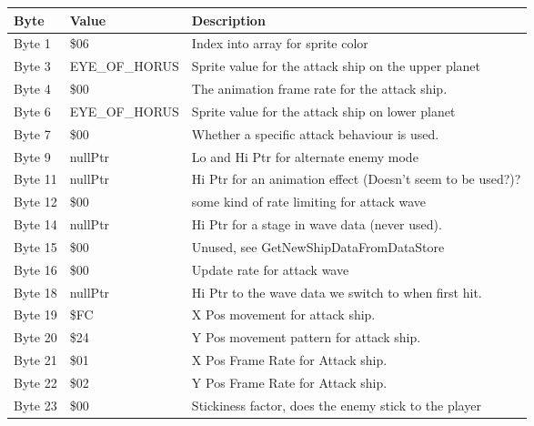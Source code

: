\begin{figure}[H]
{\begin{adjustbox}{width=12cm}
\begin{tabular}{lll}
\toprule
 Byte    & Value              & Description                                                        \\
\midrule
 Byte 1  & \$06                & Index into array for sprite color                                  \\
 Byte 3  & EYE\_OF\_HORUS       & Sprite value for the attack ship on the upper planet               \\
 Byte 4  & \$00                & The animation frame rate for the attack ship.                      \\
 Byte 6  & EYE\_OF\_HORUS       & Sprite value for the attack ship on lower planet                   \\
 Byte 7  & \$00                & Whether a specific attack behaviour is used.                       \\
 Byte 9  & nullPtr            & Lo and Hi Ptr for alternate enemy mode                             \\
 Byte 11 & nullPtr            & Hi Ptr for an animation effect (Doesn't seem to be used?)?         \\
 Byte 12 & \$00                & some kind of rate limiting for attack wave                         \\
 Byte 14 & nullPtr            & Hi Ptr for a stage in wave data (never used).                      \\
 Byte 15 & \$00                & Unused, see GetNewShipDataFromDataStore                            \\
 Byte 16 & \$00                & Update rate for attack wave                                        \\
 Byte 18 & nullPtr            & Hi Ptr to the wave data we switch to when first hit.               \\
 Byte 19 & \$FC                & X Pos movement for attack ship.                                    \\
 Byte 20 & \$24                & Y Pos movement pattern for attack ship.                            \\
 Byte 21 & \$01                & X Pos Frame Rate for Attack ship.                                  \\
 Byte 22 & \$02                & Y Pos Frame Rate for Attack ship.                                  \\
 Byte 23 & \$00                & Stickiness factor, does the enemy stick to the player              \\

\end{tabular}
\end{adjustbox}}
\end{figure}
